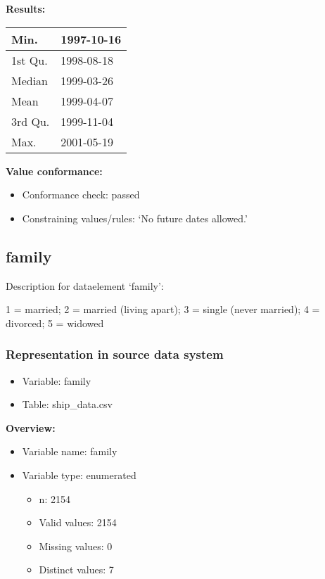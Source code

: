 \documentclass[
]{article}
\providecommand{\tightlist}{%
  \setlength{\itemsep}{0pt}\setlength{\parskip}{0pt}}
\begin{document}
\textbf{Results:}\\

\begin{table}[H]
\centering
\begin{tabular}{l|l}
\hline
Min. & 1997-10-16\\
\hline
1st Qu. & 1998-08-18\\
\hline
Median & 1999-03-26\\
\hline
Mean & 1999-04-07\\
\hline
3rd Qu. & 1999-11-04\\
\hline
Max. & 2001-05-19\\
\hline
\end{tabular}
\end{table}

\textbf{Value conformance:}

\begin{itemize}
\tightlist
\item
  Conformance check: passed
\item
  Constraining values/rules: `No future dates allowed.'
\end{itemize}

\newpage

\hypertarget{family}{%
\subsection{family}\label{family}}

Description for dataelement `family':

1 = married; 2 = married (living apart); 3 = single (never married); 4 =
divorced; 5 = widowed

\hypertarget{representation-in-source-data-system-11}{%
\subsubsection{\texorpdfstring{Representation in \textbf{source} data
system}{Representation in source data system}}\label{representation-in-source-data-system-11}}

\begin{itemize}
\tightlist
\item
  Variable: family
\item
  Table: ship\_data.csv
\end{itemize}

\textbf{Overview:}

\begin{itemize}
\tightlist
\item
  Variable name: family
\item
  Variable type: enumerated

  \begin{itemize}
  \tightlist
  \item
    n: 2154
  \item
    Valid values: 2154
  \item
    Missing values: 0
  \item
    Distinct values: 7
  \end{itemize}
\end{itemize}
\end{document}
